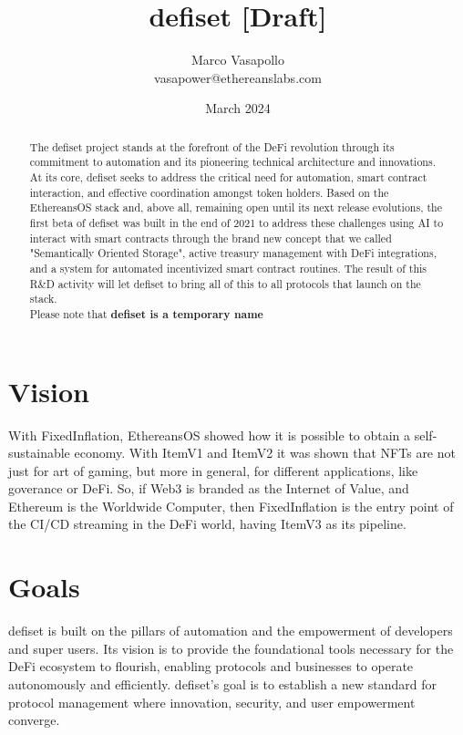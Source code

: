 \documentclass[11pt,oneside,a4paper]{article}
\title{ defiset [Draft]}
\author{
         Marco Vasapollo \\ {vasapower@ethereanslabs.com}
}
\date{March 2024}
\begin{document}
\maketitle

\begin{abstract}
The defiset project stands at the forefront of the DeFi revolution through its commitment to automation and its pioneering technical architecture and innovations. At its core, defiset seeks to address the critical need for automation, smart contract interaction, and effective coordination amongst token holders. Based on the EthereansOS stack and, above all, remaining open until its next release evolutions, the first beta of defiset was built in the end of 2021 to address these challenges using AI to interact with smart contracts through the brand new concept that we called "Semantically Oriented Storage", active treasury management with DeFi integrations, and a system for automated incentivized smart contract routines. The result of this R\&D activity will let defiset to bring all of this to all protocols that launch on the stack.
\\ Please note that \textbf{defiset is a temporary name}
\end{abstract}

\pagebreak
\tableofcontents
\pagebreak

\section{Vision}
With FixedInflation, EthereansOS showed how it is possible to obtain a self-sustainable economy.
With ItemV1 and ItemV2 it was shown that NFTs are not just for art of gaming, but more in general, for different applications, like goverance or DeFi.
So, if Web3 is branded as the Internet of Value, and Ethereum is the Worldwide Computer, then FixedInflation is the entry point of the CI/CD streaming in the DeFi world, having ItemV3 as its pipeline.

\section{Goals}
defiset is built on the pillars of automation and the empowerment of developers and super users. Its vision is to provide the foundational tools necessary for the DeFi ecosystem to flourish, enabling protocols and businesses to operate autonomously and efficiently. defiset's goal is to establish a new standard for protocol management where innovation, security, and user empowerment converge.
\end{document}
